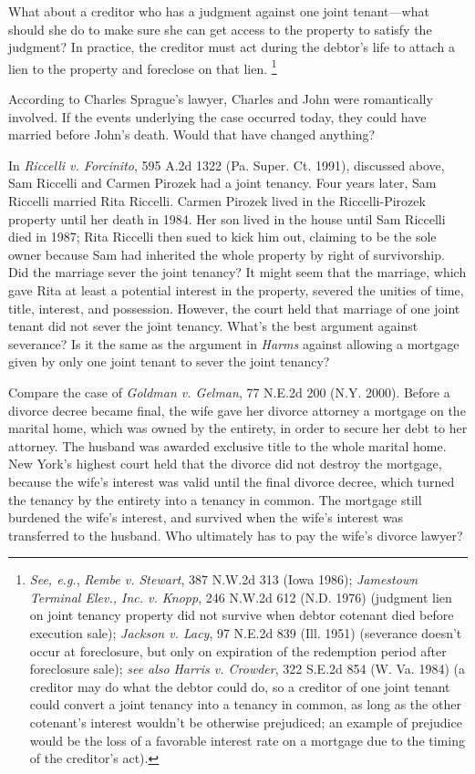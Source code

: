 What about a creditor who has a judgment against one joint tenant---what should
she do to make sure she can get access to the property to satisfy the judgment?
In practice, the creditor must act during the debtor's life to attach a lien to
the property and foreclose on that lien. \footnote{\textit{See, e.g.},
\emph{Rembe v.
Stewart}, 387 N.W.2d 313 (Iowa 1986); \emph{Jamestown Terminal Elev., Inc. v.
Knopp}, 246 N.W.2d 612 (N.D. 1976) (judgment lien on joint tenancy property did
not survive when debtor cotenant died before execution sale); \emph{Jackson v.
Lacy}, 97 N.E.2d 839 (Ill. 1951) (severance doesn't occur at foreclosure, but
only on expiration of the redemption period after foreclosure sale); \textit{see
also} \emph{Harris v. Crowder}, 322 S.E.2d 854 (W. Va. 1984) (a creditor may do
what the debtor could do, so a creditor of one joint tenant could convert a
joint tenancy into a tenancy in common, as long as the other cotenant's interest
wouldn't be otherwise prejudiced; an example of prejudice would be the loss of a
favorable interest rate on a mortgage due to the timing of the creditor's act).}



\item According to Charles Sprague's lawyer, Charles and John were romantically
involved. If the events underlying the case occurred today, they could have
married before John's death. Would that have changed anything?


In \emph{Riccelli v. Forcinito}, 595 A.2d 1322 (Pa. Super. Ct. 1991), discussed
above, Sam Riccelli and Carmen Pirozek had a joint tenancy. Four years later,
Sam Riccelli married Rita Riccelli. Carmen Pirozek lived in the Riccelli-Pirozek
property until her death in 1984. Her son lived in the house until Sam Riccelli
died in 1987; Rita Riccelli then sued to kick him out, claiming to be the sole
owner because Sam had inherited the whole property by right of survivorship. Did
the marriage sever the joint tenancy? It might seem that the marriage, which
gave Rita at least a potential interest in the property, severed the unities of
time, title, interest, and possession. However, the court held that marriage of
one joint tenant did not sever the joint tenancy. What's the best argument
against severance? Is it the same as the argument in \textit{Harms} against
allowing a mortgage given by only one joint tenant to sever the joint tenancy?



Compare the case of \textit{Goldman v. Gelman}, 77 N.E.2d 200 (N.Y. 2000).
Before a divorce decree became final, the wife gave her divorce attorney a
mortgage on the marital home, which was owned by the entirety, in order to
secure her debt to her attorney. The husband was awarded exclusive title to
the whole marital home. New York's highest court held that the divorce did not
destroy the mortgage, because the wife's interest was valid until the final
divorce decree, which turned the tenancy by the entirety into a tenancy in
common. The mortgage still burdened the wife's interest, and survived when the
wife's interest was transferred to the husband. Who ultimately has to pay the
wife's divorce lawyer?



